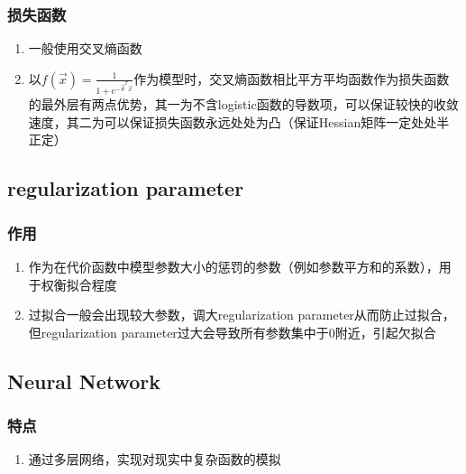 \documentclass[onecolumn]{article}
\begin{document}
        \subsubsection{损失函数}
            \noindent
            \begin{enumerate}
                \item 一般使用交叉熵函数
                \item 以$f(\vec{x})=\frac{1}{1+e^{-\vec{\theta}^T\vec{x}}}$作为模型时，交叉熵函数相比平方平均函数作为损失函数的最外层有两点优势，其一为不含logistic函数的导数项，可以保证较快的收敛速度，其二为可以保证损失函数永远处处为凸（保证Hessian矩阵一定处处半正定）
            \end{enumerate}
    \subsection{regularization parameter}
        \subsubsection{作用}
            \noindent
            \begin{enumerate}
                \item 作为在代价函数中模型参数大小的惩罚的参数（例如参数平方和的系数），用于权衡拟合程度
                \item 过拟合一般会出现较大参数，调大regularization parameter从而防止过拟合，但regularization parameter过大会导致所有参数集中于0附近，引起欠拟合
            \end{enumerate}
    \subsection{Neural Network}
        \subsubsection{特点}
            \noindent
            \begin{enumerate}
                \item 通过多层网络，实现对现实中复杂函数的模拟
            \end{enumerate}
\end{document}
